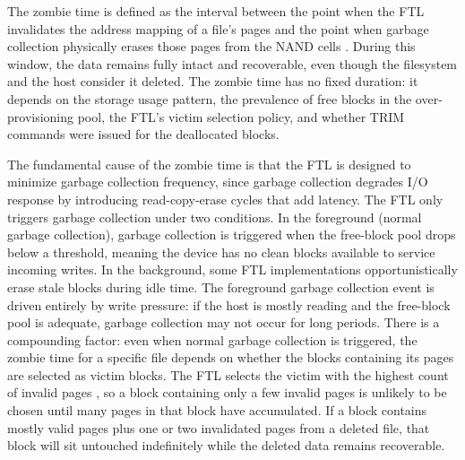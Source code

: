 The zombie time is defined as the interval between the point when the FTL invalidates the address 
mapping of a file's pages and the point when garbage collection physically erases those pages from 
the NAND cells \cite{antiforensics2016}. During this window, the data remains fully intact and 
recoverable, even though the filesystem and the host consider it deleted. The zombie time has no 
fixed duration: it depends on the storage usage pattern, the prevalence of free blocks in the 
over-provisioning pool, the FTL's victim selection policy, and whether TRIM commands were issued for 
the deallocated blocks.

The fundamental cause of the zombie time is that the FTL is designed to minimize garbage collection 
frequency, since garbage collection degrades I/O response by introducing read-copy-erase cycles 
that add latency. The FTL only triggers garbage collection under two conditions. In the foreground 
(normal garbage collection), garbage collection is triggered when the free-block pool drops below a threshold, 
meaning the device has no clean blocks available to service incoming writes. In the background, some 
FTL implementations opportunistically erase stale blocks during idle time. The foreground garbage collection event 
is driven entirely by write pressure: if the host is mostly reading and the free-block pool is 
adequate, garbage collection may not occur for long periods. There is a compounding factor: even 
when normal garbage collection is triggered, the zombie time for a specific file depends on whether the blocks 
containing its pages are selected as victim blocks. The FTL selects the victim with the highest 
count of invalid pages \cite{antiforensics2016}, so a block containing only a few invalid pages is 
unlikely to be chosen until many pages in that block have accumulated. If a block contains mostly 
valid pages plus one or two invalidated pages from a deleted file, that block will sit untouched 
indefinitely while the deleted data remains recoverable. 

